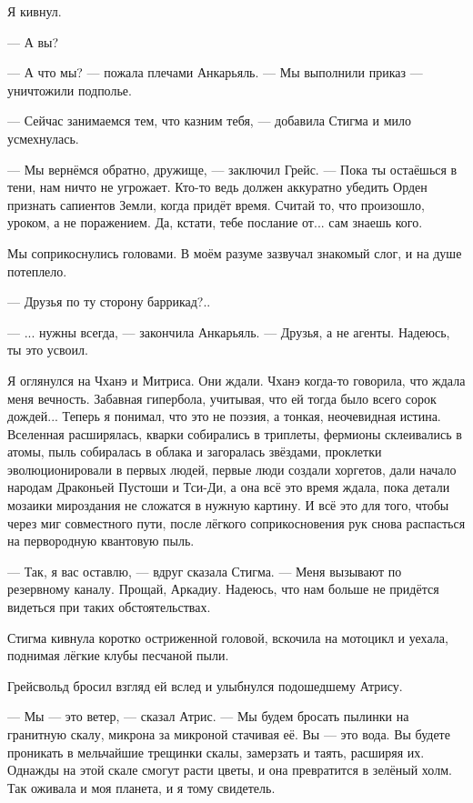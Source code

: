 Я кивнул.

--- А вы?

--- А что мы? --- пожала плечами Анкарьяль.
--- Мы выполнили приказ --- уничтожили подполье.

--- Сейчас занимаемся тем, что казним тебя, --- добавила Стигма и мило усмехнулась.

--- Мы вернёмся обратно, дружище, --- заключил Грейс.
--- Пока ты остаёшься в тени, нам ничто не угрожает.
Кто-то ведь должен аккуратно убедить Орден признать сапиентов Земли, когда придёт время.
Считай то, что произошло, уроком, а не поражением.
Да, кстати, тебе послание от... сам знаешь кого.

Мы соприкоснулись головами.
В моём разуме зазвучал знакомый слог, и на душе потеплело.

--- Друзья по ту сторону баррикад?..

--- ... нужны всегда, --- закончила Анкарьяль.
--- Друзья, а не агенты.
Надеюсь, ты это усвоил.

Я оглянулся на Чханэ и Митриса.
Они ждали.
Чханэ когда-то говорила, что ждала меня вечность.
Забавная гипербола, учитывая, что ей тогда было всего сорок дождей...
Теперь я понимал, что это не поэзия, а тонкая, неочевидная истина.
Вселенная расширялась, кварки собирались в триплеты, фермионы склеивались в атомы, пыль собиралась в облака и загоралась звёздами, проклетки эволюционировали в первых людей, первые люди создали хоргетов, дали начало народам Драконьей Пустоши и Тси-Ди, а она всё это время ждала, пока детали мозаики мироздания не сложатся в нужную картину.
И всё это для того, чтобы через миг совместного пути, после лёгкого соприкосновения рук снова распасться на первородную квантовую пыль.

--- Так, я вас оставлю, --- вдруг сказала Стигма.
--- Меня вызывают по резервному каналу.
Прощай, Аркадиу.
Надеюсь, что нам больше не придётся видеться при таких обстоятельствах.

Стигма кивнула коротко остриженной головой, вскочила на мотоцикл и уехала, поднимая лёгкие клубы песчаной пыли.

Грейсвольд бросил взгляд ей вслед и улыбнулся подошедшему Атрису.

--- Мы --- это ветер, --- сказал Атрис.
--- Мы будем бросать пылинки на гранитную скалу, микрона за микроной стачивая её.
Вы --- это вода.
Вы будете проникать в мельчайшие трещинки скалы, замерзать и таять, расширяя их.
Однажды на этой скале смогут расти цветы, и она превратится в зелёный холм.
Так оживала и моя планета, и я тому свидетель.


